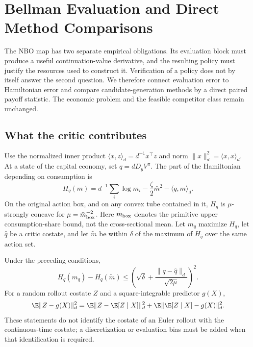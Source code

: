 \section{Bellman Evaluation and Direct Method Comparisons}\label{sec:r12theory}
The NBO map has two separate empirical obligations. Its evaluation block must produce a useful continuation-value derivative, and the resulting policy must justify the resources used to construct it. Verification of a policy does not by itself answer the second question. We therefore connect evaluation error to Hamiltonian error and compare candidate-generation methods by a direct paired payoff statistic. The economic problem and the feasible competitor class remain unchanged.

\subsection{What the critic contributes}
Use the normalized inner product $\langle x,z\rangle_d=d^{-1}x^\top z$ and norm $\|x\|_d^2=\langle x,x\rangle_d$. At a state of the capital economy, set $q=dD_yV^\pi$. The part of the Hamiltonian depending on consumption is
\[
 H_q(m)=d^{-1}\sum_i\log m_i-\frac\zeta2\bar m^2-\langle q,m\rangle_d.
\]
On the original action box, and on any convex tube contained in it, $H_q$ is $\mu$-strongly concave for $\mu=\bar m_{\rm box}^{-2}$. Here $\bar m_{\rm box}$ denotes the primitive upper consumption-share bound, not the cross-sectional mean. Let $m_q$ maximize $H_q$, let $\widehat q$ be a critic costate, and let $\widetilde m$ be within $\delta$ of the maximum of $H_{\widehat q}$ over the same action set.

\begin{proposition}\label{prop:r12costate}
Under the preceding conditions,
\begin{equation}\label{eq:r12actionloss}
 H_q(m_q)-H_q(\widetilde m)
 \leq\left(\sqrt\delta+\frac{\|q-\widehat q\|_d}{\sqrt{2\mu}}\right)^2.
\end{equation}
For a random rollout costate $Z$ and a square-integrable predictor $g(X)$,
\begin{equation}\label{eq:r12projection}
 \E\|Z-g(X)\|_d^2
 =\E\|Z-\E[Z\mid X]\|_d^2+
   \E\|\E[Z\mid X]-g(X)\|_d^2.
\end{equation}
These statements do not identify the costate of an Euler rollout with the continuous-time costate; a discretization or evaluation bias must be added when that identification is required.
\end{proposition}

